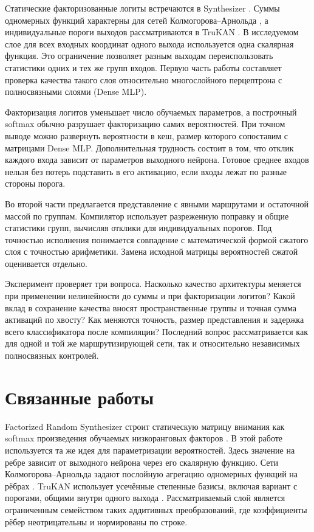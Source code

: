 \documentclass[11pt,a4paper]{article}
\begin{document}
Статические факторизованные логиты встречаются в Synthesizer \cite{tay2021}. Суммы одномерных функций характерны для сетей Колмогорова--Арнольда \cite{liu2025}, а индивидуальные пороги выходов рассматриваются в TruKAN \cite{bayeh2026}. В исследуемом слое для всех входных координат одного выхода используется одна скалярная функция. Это ограничение позволяет разным выходам переиспользовать статистики одних и тех же групп входов. Первую часть работы составляет проверка качества такого слоя относительно многослойного перцептрона с полносвязными слоями (Dense MLP).

Факторизация логитов уменьшает число обучаемых параметров, а построчный softmax обычно разрушает факторизацию самих вероятностей. При точном выводе можно развернуть вероятности в кеш, размер которого сопоставим с матрицами Dense MLP. Дополнительная трудность состоит в том, что отклик каждого входа зависит от параметров выходного нейрона. Готовое среднее входов нельзя без потерь подставить в его активацию, если входы лежат по разные стороны порога.

Во второй части предлагается представление с явными маршрутами и остаточной массой по группам. Компилятор использует разреженную поправку и общие статистики групп, вычисляя отклики для индивидуальных порогов. Под точностью исполнения понимается совпадение с математической формой сжатого слоя с точностью арифметики. Замена исходной матрицы вероятностей сжатой оценивается отдельно.

Эксперимент проверяет три вопроса. Насколько качество архитектуры меняется при применении нелинейности до суммы и при факторизации логитов? Какой вклад в сохранение качества вносят пространственные группы и точная сумма активаций по хвосту? Как меняются точность, размер представления и задержка всего классификатора после компиляции? Последний вопрос рассматривается как для одной и той же маршрутизирующей сети, так и относительно независимых полносвязных контролей.

\section{Связанные работы}
Factorized Random Synthesizer строит статическую матрицу внимания как softmax произведения обучаемых низкоранговых факторов \cite{tay2021}. В этой работе используется та же идея для параметризации вероятностей. Здесь значение на ребре зависит от выходного нейрона через его скалярную функцию. Сети Колмогорова--Арнольда задают послойную агрегацию одномерных функций на рёбрах \cite{liu2025}. TruKAN использует усечённые степенные базисы, включая вариант с порогами, общими внутри одного выхода \cite{bayeh2026}. Рассматриваемый слой является ограниченным семейством таких аддитивных преобразований, где коэффициенты рёбер неотрицательны и нормированы по строке.
\end{document}
